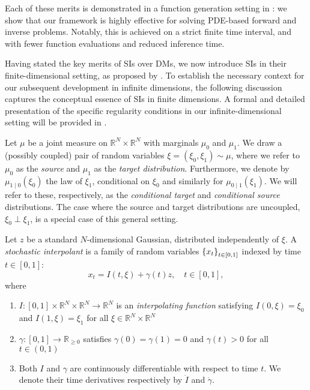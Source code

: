 Each of these merits is demonstrated in a function generation setting in : we show that our framework is highly effective for solving PDE-based forward and inverse problems. Notably, this is achieved on a strict finite time interval, and with fewer function evaluations and reduced inference time.

Having stated the key merits of SIs over DMs, we now introduce SIs in their finite-dimensional setting, as proposed by \citet{albergo2023stochasticinterpolantsunifyingframework,albergo2023stochastic}. To establish the necessary context for our subsequent development in infinite dimensions, the following discussion captures the conceptual essence of SIs in finite dimensions. A formal and detailed presentation of the specific regularity conditions in our infinite-dimensional setting will be provided in .

Let \(\mu\) be a joint measure on \(\mathbb{R}^{N} \times \mathbb{R}^{N}\) with marginals \(\mu_{0}\) and \(\mu_{1}\). We draw a (possibly coupled) pair of random variables \(\xi = (\xi_{0}, \xi_{1}) \sim \mu\), where we refer to \(\mu_{0}\) as the \textit{source} and \(\mu_{1}\) as the \textit{target distribution}. Furthermore, we denote by \(\mu_{1 \mid 0}(\xi_{0})\) the law of \(\xi_{1}\), conditional on \(\xi_{0}\) and similarly for \(\mu_{0 \mid 1}(\xi_{1})\). We will refer to these, respectively, as the \textit{conditional target} and \textit{conditional source} distributions. The case where the source and target distributions are uncoupled, \(\xi_{0} \perp \xi_{1}\), is a special case of this general setting.


Let \(z\) be a standard \(N\)-dimensional Gaussian, distributed independently of \(\xi\). A \textit{stochastic interpolant} is a family of random variables \(\qty{x_{t}}_{t \in [0, 1]}\) indexed by time \(t \in [0, 1]\):
\[
  x_{t} = I(t, \xi) + \gamma(t)z, \quad t \in [0, 1],
\]
where
\begin{enumerate}
  \item \(I : [0, 1] \times \mathbb{R}^{N} \times \mathbb{R}^{N} \to \mathbb{R}^{N}\) is an \textit{interpolating function} satisfying \(I(0, \xi) = \xi_{0}\) and \(I(1, \xi) = \xi_{1}\) for all \(\xi \in \mathbb{R}^{N} \times \mathbb{R}^{N}\)
  \item \(\gamma : [0, 1] \to \mathbb{R}_{\geq 0}\) satisfies \(\gamma(0) = \gamma(1) = 0\) and \(\gamma(t) > 0\) for all \(t \in (0, 1)\)
  \item Both \(I\) and \(\gamma\) are continuously differentiable with respect to time \(t\). We denote their time derivatives respectively by \(\dot{I}\) and \(\dot{\gamma}\).
\end{enumerate}


